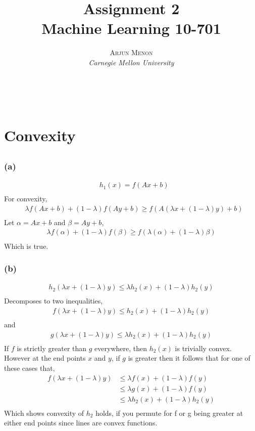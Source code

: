 \documentclass[letterpaper,10pt]{article} %
\title{\textbf{Assignment 2}\\ %
Machine Learning 10-701} %
\author{\textsc{Arjun Menon} %
\\{\textit{Carnegie Mellon University}}} %
\makeatletter
\newcommand{\lm}{\lambda}
\newcommand{\LML}[2]{\lm #1 + (1-\lm) #2}
\renewcommand{\maketitle}{ %
\begin{flushright} %
{\LARGE\@title} %

{\large\@author} %
\\\@date %

\end{flushright}
}
\makeatother
\begin{document}
\maketitle %

\section{Convexity}
\subsection{}
\subsubsection*{(a)}
\begin{align*}
&h_1(x) = f(Ax+b)\\
\end{align*}
For convexity,
\begin{align*}
&\lm f(Ax+b) + (1-\lm)f(Ay+b) \geq f(A(\lm x + (1-\lm)y) +b)\\
\end{align*}
Let $\alpha = Ax+b$ and $\beta = Ay+b$,
\begin{align*}
\lm f(\alpha) + (1-\lm) f(\beta) \geq f(\lm(\alpha) + (1-\lm)\beta)\\
\end{align*}
Which is true.

\subsubsection*{(b)}
\begin{align*}
h_2(\LML{x}{y}) \leq \lm h_2(x) + (1-\lm)h_2(y) \\
\end{align*}
Decomposes to two inequalities,
\begin{align*}
f(\LML{x}{y}) \leq h_2(x) + (1-\lm)h_2(y)\\
\end{align*}
and\\
\begin{align*}
g(\LML{x}{y}) \leq \lm h_2(x) + (1-\lm)h_2(y)\\
\end{align*}
If $f$ is strictly greater than $g$ everywhere, then $h_2(x)$ is trivially convex. However at the end points $x$ and $y$, if $g$ is greater then it follows that for one of these cases that,\\
\begin{align*}
f(\LML{x}{y}) &\leq \LML{f(x)}{f(y)}\\
          &\leq \LML{g(x)}{f(y)}\\
          &\leq \lm h_2(x) + (1-\lm)h_2(y) \\
\end{align*}
Which shows convexity of $h_2$ holds, if you permute for f or g being greater at either end points since lines are convex functions.
\end{document}
